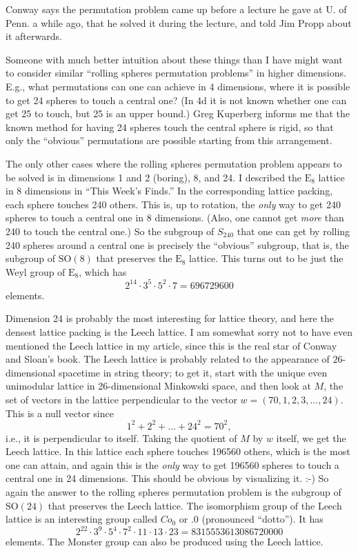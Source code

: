 \documentclass{article}
\begin{document}
Conway says the permutation problem came up before a lecture he gave at
U. of Penn. a while ago, that he solved it during the lecture, and told
Jim Propp about it afterwards.

Someone with much better intuition about these things than I have might
want to consider similar ``rolling spheres permutation problems'' in
higher dimensions. E.g., what permutations can one can achieve in 4
dimensions, where it is possible to get 24 spheres to touch a central
one? (In 4d it is not known whether one can get 25 to touch, but 25 is
an upper bound.) Greg Kuperberg informs me that the known method for
having 24 spheres touch the central sphere is rigid, so that only the
``obvious'' permutations are possible starting from this arrangement.

The only other cases where the rolling spheres permutation problem
appears to be solved is in dimensions 1 and 2 (boring), 8, and 24. I
described the \(\mathrm{E}_8\) lattice in 8 dimensions in ``This Week's
Finds.'' In the corresponding lattice packing, each sphere touches 240
others. This is, up to rotation, the \emph{only} way to get 240 spheres
to touch a central one in 8 dimensions. (Also, one cannot get
\emph{more} than 240 to touch the central one.) So the subgroup of
\(S_{240}\) that one can get by rolling 240 spheres around a central one
is precisely the ``obvious'' subgroup, that is, the subgroup of
\(\mathrm{SO}(8)\) that preserves the \(\mathrm{E}_8\) lattice. This
turns out to be just the Weyl group of \(\mathrm{E}_8\), which has
\[2^{14}\cdot 3^5\cdot 5^2\cdot 7 = 696729600\] elements.

Dimension 24 is probably the most interesting for lattice theory, and
here the densest lattice packing is the Leech lattice. I am somewhat
sorry not to have even mentioned the Leech lattice in my article, since
this is the real star of Conway and Sloan's book. The Leech lattice is
probably related to the appearance of \(26\)-dimensional spacetime in
string theory; to get it, start with the unique even unimodular lattice
in 26-dimensional Minkowski space, and then look at \(M\), the set of
vectors in the lattice perpendicular to the vector
\(w = (70,1,2,3,...,24)\). This is a null vector since
\[1^2 + 2^2 + ... + 24^2 = 70^2,\] i.e., it is perpendicular to itself.
Taking the quotient of \(M\) by \(w\) itself, we get the Leech lattice.
In this lattice each sphere touches 196560 others, which is the most one
can attain, and again this is the \emph{only} way to get 196560 spheres
to touch a central one in 24 dimensions. This should be obvious by
visualizing it. :-) So again the answer to the rolling spheres
permutation problem is the subgroup of \(\mathrm{SO}(24)\) that
preserves the Leech lattice. The isomorphism group of the Leech lattice
is an interesting group called \(Co_0\) or \(.0\) (pronounced
``dotto''). It has
\[2^{22}\cdot 3^9\cdot 5^4\cdot 7^2\cdot 11\cdot 13\cdot 23 = 8315553613086720000\]
elements. The Monster group can also be produced using the Leech
lattice.
\end{document}
